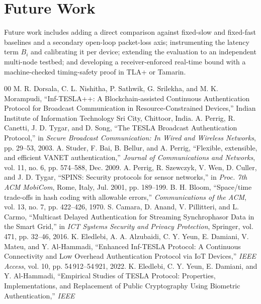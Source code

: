 \documentclass[conference]{IEEEtran}
\begin{document}
\section{Future Work}
Future work includes adding a direct comparison against fixed-slow and fixed-fast
baselines and a secondary open-loop packet-loss axis; instrumenting the latency
term $B_i$ and calibrating it per device; extending the evaluation to an
independent multi-node testbed; and developing a receiver-enforced real-time bound
with a machine-checked timing-safety proof in TLA+ or Tamarin.

\begin{thebibliography}{00}
 M. R. Dorsala, C. L. Nishitha, P. Sathwik, G. Srilekha, and
M. K. Morampudi, ``Inf-TESLA++: A Blockchain-assisted Continuous Authentication
Protocol for Broadcast Communication in Resource-Constrained Devices,'' Indian
Institute of Information Technology Sri City, Chittoor, India.
 A. Perrig, R. Canetti, J. D. Tygar, and D. Song, ``The TESLA
Broadcast Authentication Protocol,'' in \emph{Secure Broadcast Communication: In
Wired and Wireless Networks}, pp. 29--53, 2003.
 A. Studer, F. Bai, B. Bellur, and A. Perrig, ``Flexible,
extensible, and efficient VANET authentication,'' \emph{Journal of Communications
and Networks}, vol. 11, no. 6, pp. 574--588, Dec. 2009.
 A. Perrig, R. Szewczyk, V. Wen, D. Culler, and J. D. Tygar,
``SPINS: Security protocols for sensor networks,'' in \emph{Proc. 7th ACM
MobiCom}, Rome, Italy, Jul. 2001, pp. 189--199.
 B. H. Bloom, ``Space/time trade-offs in hash coding with
allowable errors,'' \emph{Communications of the ACM}, vol. 13, no. 7, pp.
422--426, 1970.
 S. Camara, D. Anand, V. Pillitteri, and L. Carmo,
``Multicast Delayed Authentication for Streaming Synchrophasor Data in the Smart
Grid,'' in \emph{ICT Systems Security and Privacy Protection}, Springer, vol.
471, pp. 32--46, 2016.
 K. Eledlebi, A. A. Alzubaidi, C. Y. Yeun, E. Damiani, V.
Mateu, and Y. Al-Hammadi, ``Enhanced Inf-TESLA Protocol: A Continuous
Connectivity and Low Overhead Authentication Protocol via IoT Devices,''
\emph{IEEE Access}, vol. 10, pp. 54\,912--54\,921, 2022.
 K. Eledlebi, C. Y. Yeun, E. Damiani, and Y. Al-Hammadi,
``Empirical Studies of TESLA Protocol: Properties, Implementations, and
Replacement of Public Cryptography Using Biometric Authentication,'' \emph{IEEE
}
\end{thebibliography}
\end{document}
